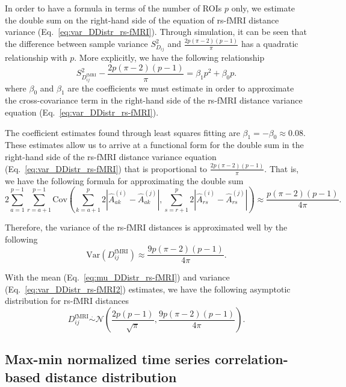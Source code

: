 \documentclass[10pt,letterpaper]{article}
\begin{document}
In order to have a formula in terms of the number of ROIs $p$ only, we estimate the double sum on the right-hand side of the equation of rs-fMRI distance variance (Eq.~\ref{eq:var_DDistr_rs-fMRI}). Through simulation, it can be seen that the difference between sample variance $S^2_{D_{ij}}$ and $\frac{2p(\pi-2)(p-1)}{\pi}$ has a quadratic relationship with $p$. More explicitly, we have the following relationship
%
\begin{equation}\label{eq:estimate_cov}
S^2_{D^\text{fMRI}_{ij}} - \frac{2p(\pi-2)(p-1)}{\pi} = \beta_1 p^2 + \beta_0 p.
\end{equation}
%
where $\beta_0$ and $\beta_1$ are the coefficients we must estimate in order to approximate the cross-covariance term in the right-hand side of the rs-fMRI distance variance equation (Eq.~\ref{eq:var_DDistr_rs-fMRI}).

The coefficient estimates found through least squares fitting are $\beta_1 = - \beta_0 \approx 0.08$. These estimates allow us to arrive at a functional form for the double sum in the right-hand side of the rs-fMRI distance variance equation (Eq.~\ref{eq:var_DDistr_rs-fMRI}) that is proportional to $\frac{2p(\pi-2)(p-1)}{\pi}$. That is, we have the following formula for approximating the double sum
%
\begin{equation}\label{eq:estimate_cov_form}
2\sum_{a = 1}^{p-1} \sum_{r=a+1}^{p-1} \text{Cov}\left(\sum_{k=a+1}^{p} 2\left|\hat{A}^{(i)}_{ak} - \hat{A}^{(j)}_{ak}\right|, \sum_{s=r+1}^{p} 2\left|\hat{A}^{(i)}_{rs} - \hat{A}^{(j)}_{rs}\right|\right) \approx \frac{p(\pi - 2)(p - 1)}{4\pi}.
\end{equation}

Therefore, the variance of the rs-fMRI distances is approximated well by the following
%
\begin{equation}\label{eq:var_DDistr_rs-fMRI2}
\text{Var}(D^\text{fMRI}_{ij}) \approx \frac{9p(\pi - 2)(p-1)}{4\pi}.
\end{equation}

With the mean (Eq.~\ref{eq:mu_DDistr_rs-fMRI}) and variance (Eq.~\ref{eq:var_DDistr_rs-fMRI2}) estimates, we have the following asymptotic distribution for rs-fMRI distances
%
\begin{equation}\label{eq:DDistr_rs-fMRI}
D^\text{fMRI}_{ij} \overset{.}{\sim} \mathcal{N}\left(\frac{2p(p-1)}{\sqrt{\pi}}, \frac{9p(\pi - 2)(p-1)}{4\pi}\right).
\end{equation}

\subsection*{Max-min normalized time series correlation-based distance distribution}
\end{document}

